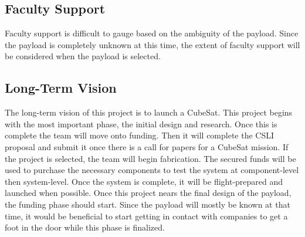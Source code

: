 \documentclass[conference]{IEEEtran} %
\begin{document}
\subsection{Faculty Support}
Faculty support is difficult to gauge based on the ambiguity of the payload. Since the payload is completely unknown at this time, the extent of faculty support will be considered when
the payload is selected.

\subsection{Long-Term Vision}
\label{sec:vision}
The long-term vision of this project is to launch a CubeSat. This project begins with the most important phase, the initial design and research. Once this is complete the team will move onto
funding. Then it will complete the CSLI proposal and submit it once there is a call for papers for a CubeSat mission. If the project is selected, the team will begin fabrication. The secured funds will
be used to purchase the necessary components to test the system at component-level then system-level. Once the system is complete, it will be flight-prepared and launched when possible. Once this project nears the
final design of the payload, the funding phase should start. Since the payload will mostly be known at that time, it would be beneficial to start getting in contact with companies to get a foot in the door while this phase is
finalized.
\end{document}
